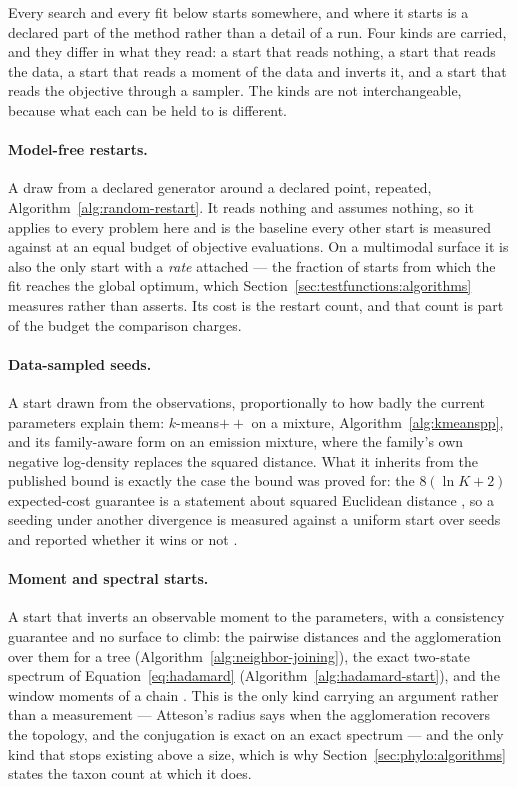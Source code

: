 \documentclass[11pt,a4paper]{article}
\begin{document}
Every search and every fit below starts somewhere, and where it starts is a
declared part of the method rather than a detail of a run. Four kinds are
carried, and they differ in what they read: a start that reads nothing, a
start that reads the data, a start that reads a moment of the data and inverts
it, and a start that reads the objective through a sampler. The kinds are not
interchangeable, because what each can be held to is different.

\paragraph{Model-free restarts.}
A draw from a declared generator around a declared point, repeated,
Algorithm~\ref{alg:random-restart}. It reads nothing and assumes nothing, so
it applies to every problem here and is the baseline every other start is
measured against at an equal budget of objective evaluations. On a multimodal
surface it is also the only start with a \emph{rate} attached --- the fraction
of starts from which the fit reaches the global optimum, which
Section~\ref{sec:testfunctions:algorithms} measures rather than asserts. Its
cost is the restart count, and that count is part of the budget the comparison
charges.

\paragraph{Data-sampled seeds.}
A start drawn from the observations, proportionally to how badly the current
parameters explain them: $k$-means$++$ on a mixture,
Algorithm~\ref{alg:kmeanspp}, and its family-aware form on an emission
mixture, where the family's own negative log-density replaces the squared
distance. What it inherits from the published bound is exactly the case the
bound was proved for: the $8(\ln K + 2)$ expected-cost guarantee is a statement
about squared Euclidean distance \citep{arthur2007}, so a seeding under another
divergence is measured against a uniform start over seeds and reported whether
it wins or not \citep{banerjee2005}.

\paragraph{Moment and spectral starts.}
A start that inverts an observable moment to the parameters, with a consistency
guarantee and no surface to climb: the pairwise distances and the agglomeration
over them for a tree (Algorithm~\ref{alg:neighbor-joining}), the exact
two-state spectrum of Equation~\ref{eq:hadamard}
(Algorithm~\ref{alg:hadamard-start}), and the window moments of a chain
\citep{hsu2012, mossel2006}. This is the only kind carrying an argument rather
than a measurement --- Atteson's radius says when the agglomeration recovers
the topology, and the conjugation is exact on an exact spectrum --- and the
only kind that stops existing above a size, which is why
Section~\ref{sec:phylo:algorithms} states the taxon count at which it does.
\end{document}
